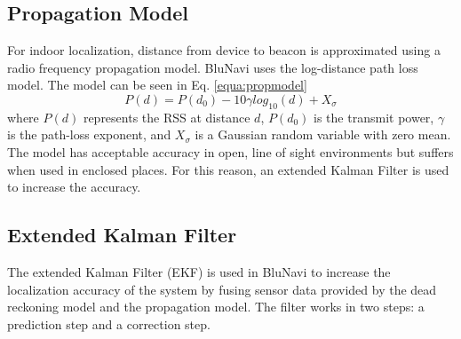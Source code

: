 \documentclass[conference]{IEEEtran}
\begin{document}
\subsection{Propagation Model}
For indoor localization, distance from device to beacon is approximated using a radio frequency propagation model. BluNavi uses the log-distance path loss model. The model can be seen in Eq. \ref{equa:propmodel}
\begin{equation}
\label{equa:propmodel}
P(d) = P(d_0) - 10{\gamma}log_{10}(d) + X_\sigma
\end{equation}
where $P(d)$ represents the RSS at distance $d$, $P(d_0)$ is the transmit power, $\gamma$ is the path-loss exponent, and $X_\sigma$ is a Gaussian random variable with zero mean. The model has acceptable accuracy in open, line of sight environments but suffers when used in enclosed places. For this reason, an extended Kalman Filter is used to increase the accuracy.

\subsection{Extended Kalman Filter}
The extended Kalman Filter (EKF) is used in BluNavi to increase the localization accuracy of the system by fusing sensor data provided by the dead reckoning model and the propagation model. The filter works in two steps: a prediction step and a correction step.
\end{document}
